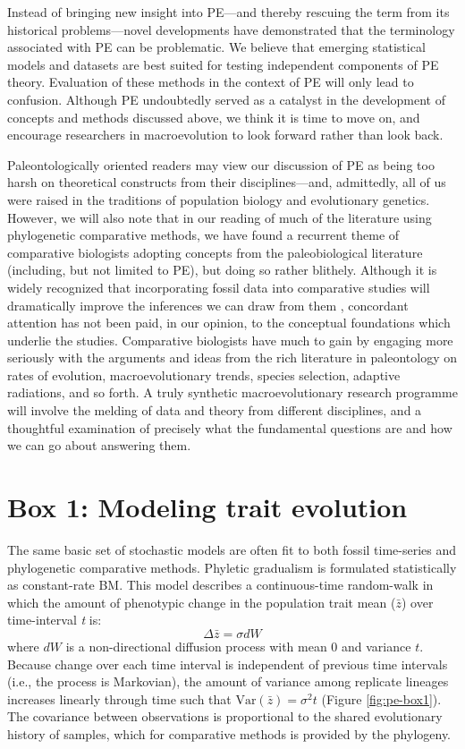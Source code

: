 Instead of bringing new insight into PE---and thereby rescuing the term from its historical problems---novel developments have demonstrated that the terminology associated with PE can be problematic. We believe that emerging statistical models and datasets are best suited for testing independent components of PE theory. Evaluation of these methods in the context of PE will only lead to confusion. Although PE undoubtedly served as a catalyst in the development of concepts and methods discussed above, we think it is time to move on, and encourage researchers in macroevolution to look forward rather than look back. 

Paleontologically oriented readers may view our discussion of PE as being too harsh on theoretical constructs from their disciplines---and, admittedly, all of us were raised in the traditions of population biology and evolutionary genetics. However, we will also note that in our reading of much of the literature using phylogenetic comparative methods, we have found a recurrent theme of comparative biologists adopting concepts from the paleobiological literature (including, but not limited to PE), but doing so rather blithely. Although it is widely recognized that incorporating fossil data into comparative studies will dramatically improve the inferences we can draw from them \citep{QuentalMarshall2010, Slater2012Fossil, PennellHarmon, Fritz2013}, concordant attention has not been paid, in our opinion, to the conceptual foundations which underlie the studies. Comparative biologists have much to gain by engaging more seriously with the arguments and ideas from the rich literature in paleontology on rates of evolution, macroevolutionary trends, species selection, adaptive radiations, and so forth. A truly synthetic macroevolutionary research programme will involve the melding of data and theory from different disciplines, and a thoughtful examination of precisely what the fundamental questions are and how we can go about answering them.

\section{Box 1: Modeling trait evolution}
The same basic set of stochastic models are often fit to both fossil time-series and phylogenetic comparative methods. Phyletic gradualism is formulated statistically as constant-rate BM. This model describes a continuous-time random-walk in which the amount of phenotypic change in the population trait mean ($\bar{z}$) over time-interval \textit{t} is:
\begin{equation}
\Delta \bar{z} = \sigma dW
\end{equation}
where $dW$ is a non-directional diffusion process with mean 0 and variance $t$. Because change over each time interval is independent of previous time intervals (i.e., the process is Markovian), the amount of variance among replicate lineages increases linearly through time such that  $\text{Var}(\bar{z}) = \sigma^2 t$ (Figure \ref{fig:pe-box1}). The covariance between observations is proportional to the shared evolutionary history of samples, which for comparative methods is provided by the phylogeny. 

